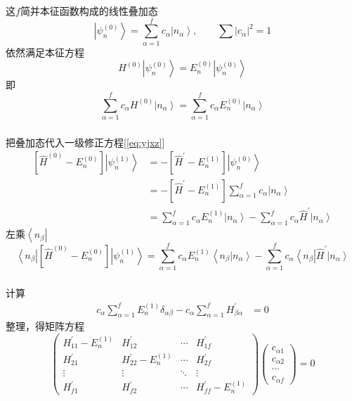 \begin{frame}
  \frametitle{}
这$f$简并本征函数构成的线性叠加态
\begin{equation}\label{eq:jbdj}
\left\vert \psi ^{(0)}_n \right\rangle = \sum_{\alpha=1}^f
c_\alpha \left\vert n_\alpha \right\rangle, \qquad \sum |c_\alpha|^2 =1 
\end{equation}
依然满足本征方程
\[ H^{(0)} \left\vert \psi ^{(0)}_n \right\rangle = E_n^{(0)} \left\vert \psi ^{(0)}_n \right\rangle \]
即
\[ \sum_{\alpha=1}^f
c_\alpha H^{(0)} \left\vert n_\alpha \right\rangle =  \sum_{\alpha=1}^f
c_\alpha E_n^{(0)}\left\vert n_\alpha \right\rangle\]
\end{frame} 

\begin{frame}
  \frametitle{}
把叠加态代入一级修正方程[\ref{eq:yjxz}]
\begin{equation*}
\begin{aligned}
  \left[\hat{H}^{(0)}-E_n^{(0)}\right]\left|\psi_n^{(1)}\right\rangle &= -\left[\hat{H}^{\prime}-E_n^{(1)}\right]\left| \psi_n^{(0)}\right\rangle \\ 
  &= -\left[\hat{H}^{\prime}-E_n^{(1)}\right]\sum_{\alpha=1}^f
  c_\alpha \left\vert n_\alpha \right\rangle \\
  &=\sum_{\alpha=1}^f
  c_\alpha E_n^{(1)}\left\vert n_\alpha \right\rangle  -\sum_{\alpha=1}^f
  c_\alpha \hat{H}^{\prime}\left\vert n_\alpha \right\rangle 
\end{aligned}
\end{equation*}
左乘$\left\langle n_\beta \right\vert$
\[\left\langle n_\beta \right\vert \left[\hat{H}^{(0)}-E_n^{(0)}\right]\left|\psi_n^{(1)}\right\rangle = \sum_{\alpha=1}^f
c_\alpha E_n^{(1)}\left\langle n_\beta \left\vert n_\alpha \right\rangle\right. -\sum_{\alpha=1}^f
c_\alpha \left\langle n_\beta \right\vert \hat{H}^{\prime}\left\vert n_\alpha \right\rangle \]
\end{frame} 

\begin{frame}
  \frametitle{}
计算
\[
  \begin{aligned}
    c_\alpha \sum_{\alpha=1}^f E_n^{(1)} \delta _{\alpha \beta} - c_\alpha \sum_{\alpha=1}^f H^{\prime}_{\beta\alpha } &=0 
  \end{aligned} 
   \]
  整理，得矩阵方程
  \begin{equation}\label{eq:jqfc}
    \begin{pmatrix}H^{\prime}_{11} -E^{(1)}_n &H^{\prime}_{12}&\cdots&H^{\prime}_{1f}\\
      H^{\prime}_{21}&H^{\prime}_{22}-E^{(1)}_n&\cdots&H^{\prime}_{2f}\\\vdots&\vdots&\ddots&\vdots\\H^{\prime}_{f 1}&H^{\prime}_{f 2}&\cdots&H^{\prime}_{ff}-E^{(1)}_n\end{pmatrix}
      \begin{pmatrix}c_{\alpha 1} \\c_{\alpha 2} \\ \cdots \\c_{\alpha f} \end{pmatrix} =0
  \end{equation}
\end{frame} 

